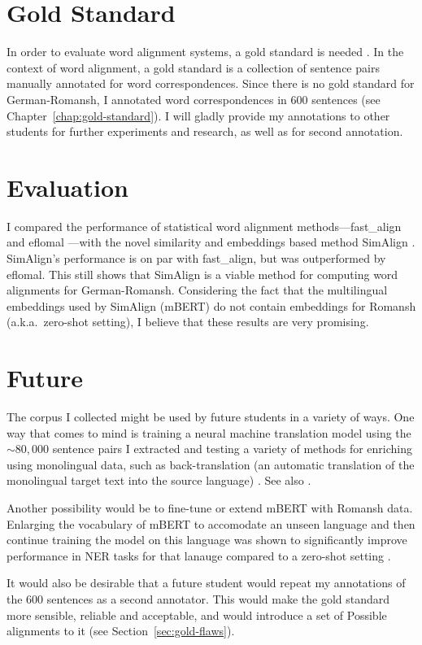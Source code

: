 \section{Gold Standard}
In order to evaluate word alignment systems, a gold standard is needed \autocite[115]{koehn2009}. 
In the context of word alignment, a gold standard is a collection of sentence pairs manually annotated for word correspondences. 
Since there is no gold standard for German-Romansh, I annotated word correspondences in 600 sentences (see Chapter~\ref{chap:gold-standard}). I will  gladly provide my annotations to other students for further experiments and research, as well as for second annotation.  

\section{Evaluation}
I compared the performance of statistical word alignment methods---fast\_align \autocite{dyer-etal-2013-simple} and eflomal \autocite{Ostling2016efmaral}---with the novel similarity and embeddings based method SimAlign \autocite{jalili-sabet-etal-2020-simalign}. 
SimAlign's performance is on par with fast\_align, but was outperformed by eflomal. 
This still shows that SimAlign is a viable method for computing word alignments for German-Romansh. 
Considering the fact that the multilingual embeddings used by SimAlign (mBERT) do not contain embeddings for Romansh (a.k.a.~zero-shot setting), I believe that these results are very promising.

\section{Future}
The corpus I collected might be used by future students in a variety of ways. 
One way that comes to mind is training a neural machine translation model using the $\sim80,000$ sentence pairs I extracted and testing a variety of methods for enriching using monolingual data, such as back-translation (an automatic translation of the monolingual target text into the source language) \autocite{sennrich-etal-2016-improving}. 
See also \cite{https://doi.org/10.48550/arxiv.2107.04239}.

Another possibility would be to fine-tune or extend mBERT with Romansh data. 
Enlarging the vocabulary of mBERT to accomodate an unseen language and then continue training the model on this language was shown to significantly improve performance in  NER tasks for that lanauge compared to a zero-shot setting \autocite{wang-etal-2020-extending}. 

It would also be desirable that a future student would repeat my annotations of the 600 sentences as a second annotator. 
This would make the gold standard more sensible, reliable and acceptable, and would introduce a set of Possible alignments to it (see Section~\ref{sec:gold-flaws}).




